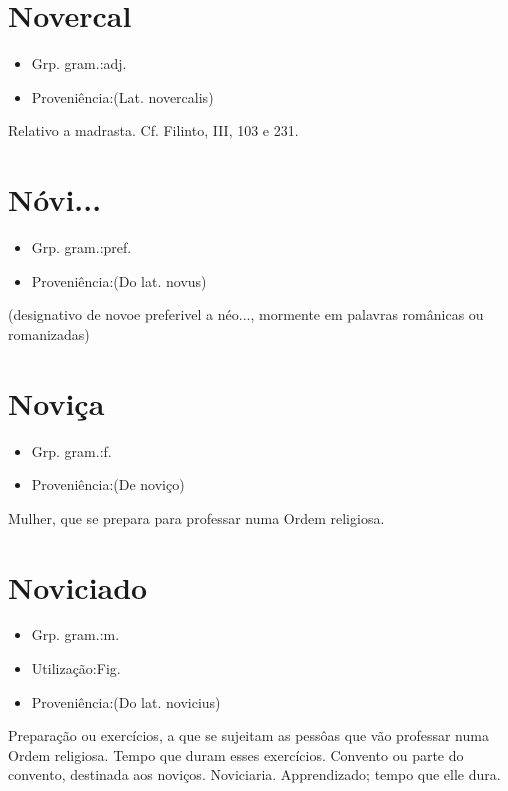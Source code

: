 \section{Novercal}
\begin{itemize}
\item {Grp. gram.:adj.}
\end{itemize}
\begin{itemize}
\item {Proveniência:(Lat. \textunderscore novercalis\textunderscore )}
\end{itemize}
Relativo a madrasta. Cf. Filinto, III, 103 e 231.
\section{Nóvi...}
\begin{itemize}
\item {Grp. gram.:pref.}
\end{itemize}
\begin{itemize}
\item {Proveniência:(Do lat. \textunderscore novus\textunderscore )}
\end{itemize}
(designativo de \textunderscore novo\textunderscore  e preferivel a \textunderscore néo...\textunderscore , mormente em palavras românicas ou romanizadas)
\section{Noviça}
\begin{itemize}
\item {Grp. gram.:f.}
\end{itemize}
\begin{itemize}
\item {Proveniência:(De \textunderscore noviço\textunderscore )}
\end{itemize}
Mulher, que se prepara para professar numa Ordem religiosa.
\section{Noviciado}
\begin{itemize}
\item {Grp. gram.:m.}
\end{itemize}
\begin{itemize}
\item {Utilização:Fig.}
\end{itemize}
\begin{itemize}
\item {Proveniência:(Do lat. \textunderscore novicius\textunderscore )}
\end{itemize}
Preparação ou exercícios, a que se sujeitam as pessôas que vão professar numa Ordem religiosa.
Tempo que duram esses exercícios.
Convento ou parte do convento, destinada aos noviços.
Noviciaria.
Apprendizado; tempo que elle dura.
